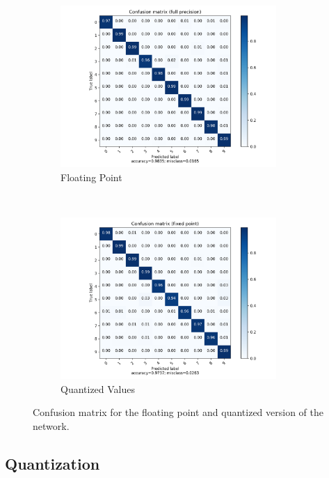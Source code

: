 \begin{figure}[hbtp]
\centering
\begin{subfigure}[t]{0.5\textwidth}
	\includegraphics[width=0.9\textwidth]{../../net/images/cm}
	\caption{Floating Point}
	\label{fig:network-test-cm}
\end{subfigure}%
~
\begin{subfigure}[t]{0.5\textwidth}
	\includegraphics[width=0.9\textwidth]{../../net/images/qcm}
	\caption{Quantized Values}
	\label{fig:network-test-qcm}
\end{subfigure}
\caption{Confusion matrix for the floating point and quantized version of the network.}
\label{fig:network-confusion-matrix}
\end{figure}


\subsection{Quantization}

